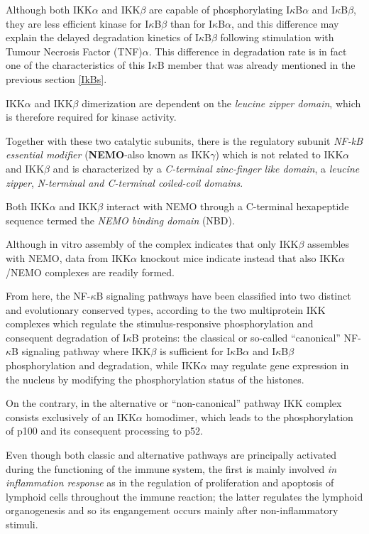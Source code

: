 \documentclass[12pt,a4paper]{report}
\begin{document}
Although both IKK$\alpha$ and IKK$\beta$ are capable of phosphorylating I$\kappa$B$\alpha$ and I$\kappa$B$\beta$, they are less efficient kinase for
I$\kappa$B$\beta$ than for I$\kappa$B$\alpha$, and this difference may explain the delayed degradation kinetics of
I$\kappa$B$\beta$ following stimulation with Tumour Necrosis Factor (TNF)$\alpha$. This difference in degradation rate is in fact one of the characteristics of this I$\kappa$B member that was already mentioned in the previous section \ref{IkBs}.

IKK$\alpha$ and IKK$\beta$ dimerization are dependent on the \emph{leucine zipper domain}, which is therefore required for kinase activity.

Together with these two catalytic subunits, there is the regulatory
subunit \emph{NF-kB essential modifier} (\textbf{NEMO}-also known as IKK$\gamma$) which is not related to
IKK$\alpha$ and IKK$\beta$ and is characterized by a \emph{C-terminal zinc-finger like domain}, a \emph{leucine
zipper}, \emph{N-terminal and C-terminal coiled-coil domains}.

Both IKK$\alpha$ and IKK$\beta$ interact with NEMO through a C-terminal hexapeptide sequence termed the \emph{NEMO binding domain} (NBD).

Although in vitro assembly of the complex indicates that only IKK$\beta$ assembles with NEMO, data from IKK$\alpha$ knockout mice indicate instead that also IKK$\alpha$/NEMO
complexes are readily formed.

From here, the NF-$\kappa$B signaling pathways have been classified into two distinct and evolutionary
conserved types, according to the two multiprotein IKK complexes which regulate the stimulus-responsive phosphorylation and consequent degradation of I$\kappa$B proteins: the classical or so-called “canonical” NF-$\kappa$B signaling pathway where IKK$\beta$ is sufficient for I$\kappa$B$\alpha$ and
I$\kappa$B$\beta$ phosphorylation and degradation, while IKK$\alpha$ may regulate gene expression in the
nucleus by modifying the phosphorylation status of the histones.

On the contrary, in the
alternative or “non-canonical” pathway IKK complex consists exclusively of an IKK$\alpha$ homodimer, which leads to the phosphorylation of p100 and its consequent processing to p52.

Even though both classic and alternative pathways are principally activated during the functioning of the immune system, the first is mainly involved \emph{in inflammation response} as in the regulation of proliferation and apoptosis of lymphoid cells throughout the
immune reaction; the latter regulates the lymphoid organogenesis and so its engangement occurs mainly after non-inflammatory stimuli.
\end{document}
